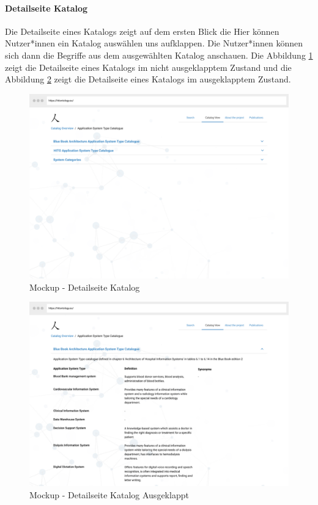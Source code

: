 \paragraph{Detailseite Katalog}

Die Detailseite eines Katalogs zeigt auf dem ersten Blick die 
Hier können Nutzer*innen ein Katalog auswählen uns aufklappen.
Die Nutzer*innen können sich dann die Begriffe aus dem ausgewählten Katalog anschauen.
Die Abbildung \ref{fig:mockup_catalogue_detail} zeigt die Detailseite eines Katalogs im nicht ausgeklapptem Zustand und die Abbildung \ref{fig:mockup_catalogue_detail_expanded} zeigt die Detailseite eines Katalogs im ausgeklapptem Zustand.

\begin{figure}[H]
	\centering
    	\includegraphics[width=\textwidth]{Images/Katalog_Detailseite}
   	\caption{Mockup - Detailseite Katalog}
   	\label{fig:mockup_catalogue_detail}
\end{figure}

\begin{figure}[H]
	\centering
    	\includegraphics[width=\textwidth]{Images/Katalog_Detailseite_Ausgeklappt}
   	\caption{Mockup - Detailseite Katalog Ausgeklappt}
   	\label{fig:mockup_catalogue_detail_expanded}
\end{figure}

